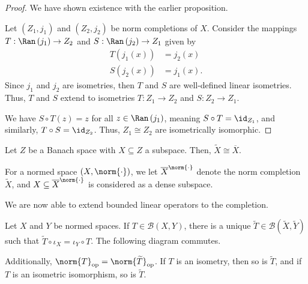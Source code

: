 \documentclass[10pt]{mypackage}
\begin{document}
\begin{proof}
  We have shown existence with the earlier proposition.\newline

  Let $\left(Z_1,j_1\right)$ and $\left(Z_2,j_2\right)$ be norm completions of $X$. Consider the mappings $T: \Ran\left(j_1\right) \rightarrow Z_2$ and $S: \Ran\left(j_2\right) \rightarrow Z_1$ given by
  \begin{align*}
    T\left(j_1(x)\right) &= j_2(x)\\
    S\left(j_2(x)\right) &= j_1(x).
  \end{align*}
  Since $j_1$ and $j_2$ are isometries, then $T$ and $S$ are well-defined linear isometries. Thus, $T$ and $S$ extend to isometries $T: Z_1\rightarrow Z_2$ and $S: Z_2\rightarrow Z_1$.\newline

  We have $S\circ T(z) = z$ for all $z\in \Ran\left(j_1\right)$, meaning $S\circ T = \id_{Z_1}$, and similarly, $T\circ S = \id_{Z_2}$. Thus, $Z_1\cong Z_2$ are isometrically isomorphic.
\end{proof}
\begin{corollary}
  Let $Z$ be a Banach space with $X\subseteq Z$ a subspace. Then, $\widetilde{X} \cong \overline{X}$.
\end{corollary}
\begin{remark}
  For a normed space $\left(X,\norm{\cdot}\right)$, we let $\overline{X}^{\norm{\cdot}}$ denote the norm completion $\widetilde{X}$, and $X\subseteq \overline{X}^{\norm{\cdot}}$ is considered as a dense subspace.
\end{remark}
We are now able to extend bounded linear operators to the completion.
\begin{proposition}
  Let $X$ and $Y$ be normed spaces. If $T\in \mathcal{B}\left(X,Y\right)$, there is a unique $\widetilde{T}\in \mathcal{B}\left(\widetilde{X},\widetilde{Y}\right)$ such that $\widetilde{T}\circ \iota_X = \iota_Y\circ T$. The following diagram commutes.
  \begin{center}
Additionally, $\norm{T}_{\text{op}} = \norm{\widetilde{T}}_{\text{op}}$. If $T$ is an isometry, then so is $\widetilde{T}$, and if $T$ is an isometric isomorphism, so is $\widetilde{T}$.
  \end{center}
\end{proposition}
\end{document}
